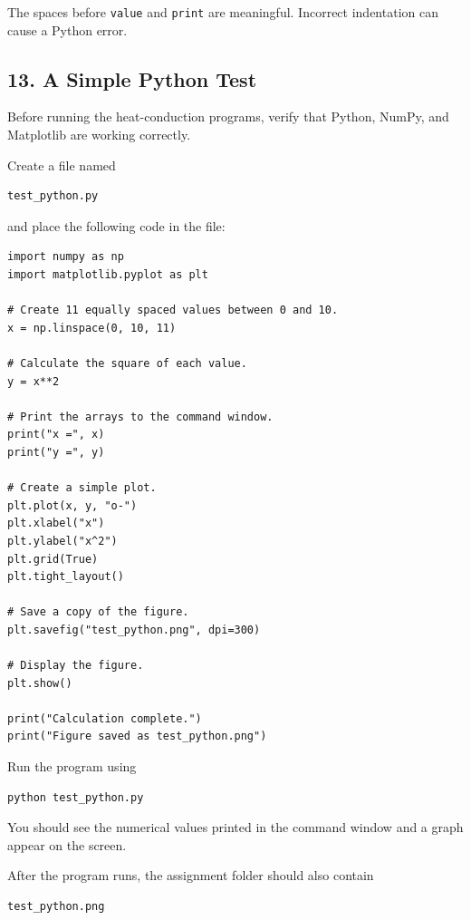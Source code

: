\documentclass[11pt]{article}
\begin{document}
The spaces before \texttt{value} and \texttt{print} are meaningful.
Incorrect indentation can cause a Python error.

\subsection*{13. A Simple Python Test}

Before running the heat-conduction programs, verify that Python,
NumPy, and Matplotlib are working correctly.

Create a file named

\begin{lstlisting}
test_python.py
\end{lstlisting}

and place the following code in the file:

\begin{lstlisting}[style=python]
import numpy as np
import matplotlib.pyplot as plt

# Create 11 equally spaced values between 0 and 10.
x = np.linspace(0, 10, 11)

# Calculate the square of each value.
y = x**2

# Print the arrays to the command window.
print("x =", x)
print("y =", y)

# Create a simple plot.
plt.plot(x, y, "o-")
plt.xlabel("x")
plt.ylabel("x^2")
plt.grid(True)
plt.tight_layout()

# Save a copy of the figure.
plt.savefig("test_python.png", dpi=300)

# Display the figure.
plt.show()

print("Calculation complete.")
print("Figure saved as test_python.png")
\end{lstlisting}

Run the program using

\begin{lstlisting}
python test_python.py
\end{lstlisting}

You should see the numerical values printed in the command window and a
graph appear on the screen.

After the program runs, the assignment folder should also contain

\begin{lstlisting}
test_python.png
\end{lstlisting}
\end{document}
